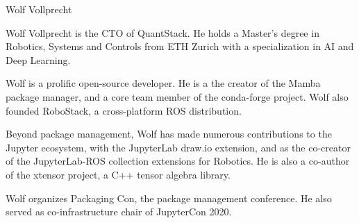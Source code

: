 \begin{participant}[type=R,PM=0,gender=male]{Wolf Vollprecht}

  Wolf Vollprecht is the CTO of QuantStack. He holds a Master's degree in Robotics, Systems and Controls from ETH Zurich with a specialization in AI and Deep Learning.

  Wolf is a prolific open-source developer. He is a the creator of the Mamba package manager, and a core team member of the conda-forge project. Wolf also founded RoboStack, a cross-platform ROS distribution.

  Beyond package management, Wolf has made numerous contributions to the Jupyter ecosystem, with the JupyterLab draw.io extension, and as the co-creator of the JupyterLab-ROS collection extensions for Robotics. He is also a co-author of the xtensor project, a C++ tensor algebra library.

  Wolf organizes Packaging Con, the package management conference. He also served as co-infrastructure chair of JupyterCon 2020.
\end{participant}

